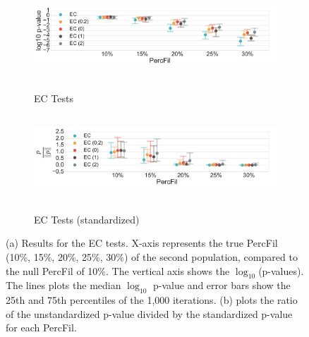 \documentclass[12pt]{article}
\begin{document}
\begin{figure}[htp!]
  \centering
  \begin{subfigure}{.75\textwidth}
    \centering
    \caption{EC Tests}
    \includegraphics[height = 1.25in]{figure_8_euler_group.pdf}
    \label{fig:sub_euler}
  \end{subfigure}
  \begin{subfigure}{.75\textwidth}
    \centering
    \caption{EC Tests (standardized)}
    \includegraphics[height = 1.25in]{figure_8_joint_euler_group.pdf}
    \label{fig:sub_euler_normed}
  \end{subfigure}
\caption{(a) Results for the EC tests. X-axis represents the true PercFil (10\%, 15\%, 20\%, 25\%, 30\%) of the second population, compared to the null PercFil of 10\%. The vertical axis shows the $\log_{10}$(p-values). The lines plots the median $\log_{10}$ p-value and error bars show the 25th and 75th percentiles of the 1,000 iterations. (b) plots the ratio of the unstandardized p-value divided by the standardized p-value for each PercFil. }
\label{fig:sub_euler_results}
\end{figure}
\end{document}
